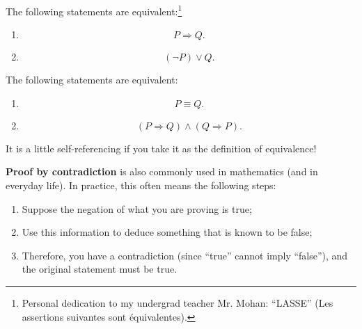 \documentclass[
	fontsize=10pt, %
	twoside=true, %
	secnumdepth=1, %
	numbers=noenddot, %
]{kaobook}
\begin{document}
\begin{proposition}
The following statements are equivalent:\footnote{Personal dedication to my undergrad teacher Mr. Mohan: ``LASSE'' (Les assertions suivantes sont équivalentes).}
\begin{enumerate}
	\item \begin{equation*}P\Rightarrow Q.\end{equation*}
	\item \begin{equation*}(\neg P) \lor Q.\end{equation*}
\end{enumerate}
\end{proposition}

\begin{proposition}
The following statements are equivalent:
\begin{enumerate}
	\item \begin{equation*}P\equiv Q.\end{equation*}
	\item \begin{equation*}(P\Rightarrow Q)\land(Q\Rightarrow P).\end{equation*}
\end{enumerate}
It is a little self-referencing if you take it as the definition of equivalence!
\end{proposition}

\textbf{Proof by contradiction} is also commonly used in mathematics (and in everyday life). In practice, this often means the following steps:
\begin{enumerate}
	\item Suppose the negation of what you are proving is true;
	\item Use this information to deduce something that is known to be false;
	\item Therefore, you have a contradiction (since ``true'' cannot imply ``false''), and the original statement must be true.
\end{enumerate}
\end{document}
